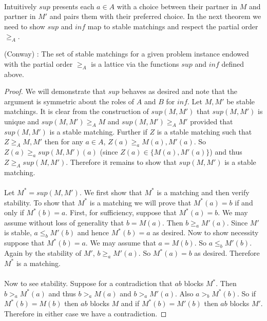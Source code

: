 \paragraph{}Intuitively $sup$  presents each $a \in A$ with a choice between their partner in $M$ and partner in $M'$ and pairs them with their preferred choice. In the next theorem we need to show $sup$ and $inf$ map to stable matchings and respect the partial order $\geq_A$.
\begin{theorem}(Conway)\label{theorem:lattice} \cite{knuthmariages}: The set of stable matchings for a given problem instance endowed with the partial order $\geq_A$ is a lattice via the functions $sup$ and $inf$ defined above.
\end{theorem}
\begin{proof}
We will demonstrate that $sup$ behaves as desired and note that the argument is symmetric about the roles of $A$ and $B$ for $inf$. Let $M, M'$ be stable matchings. It is clear from the construction of $sup(M,M')$ that  $sup(M,M')$ is unique and $sup(M,M') \geq_A M$ and $sup(M,M') \geq_A M'$ provided that $sup(M,M')$ is a stable matching. Further if $Z$ is a stable matching such that $Z \geq_A M, M'$ then for any $a \in A$, $Z(a) \geq_a M(a),M'(a)$. So $Z(a) \geq_a sup(M,M')(a)$ (since $Z(a) \in \{M(a), M'(a) \}$) and thus $Z \geq_A sup(M,M')$. Therefore it remains to show that $sup(M,M')$ is a stable matching.
\paragraph{}
Let $M^* = sup(M,M')$. We first show that $M^*$ is a matching and then verify stability. To show that $M^*$ is a matching we will prove that $M^*(a) = b$ if and only if $M^*(b) = a$. First, for sufficiency, suppose that $M^*(a) = b$.  We may assume without loss of generality that $b = M(a)$. Then $b \geq_a M'(a)$. Since $M'$ is stable, $a \leq_b M'(b)$ and hence $M^*(b) = a$ as desired. Now to show necessity suppose that $M^*(b) = a$. We may assume that $a = M(b)$. So $a \leq_b M'(b)$. Again by the stability of $M'$, $b \geq_a M'(a)$. So $M^*(a) = b$ as desired. Therefore $M^*$ is a matching. 
\paragraph{}
Now to see stability. Suppose for a contradiction that $ab$ blocks $M^*$. Then $b >_a M^*(a)$ and thus $b>_a M(a)$ and $b >_a M'(a)$. Also $a >_b M^*(b)$. So if $M^*(b) = M(b)$ then $ab$ blocks $M$ and if $M^*(b) = M'(b)$ then $ab$ blocks $M'$. Therefore in either case we have  a contradiction. \end{proof}
